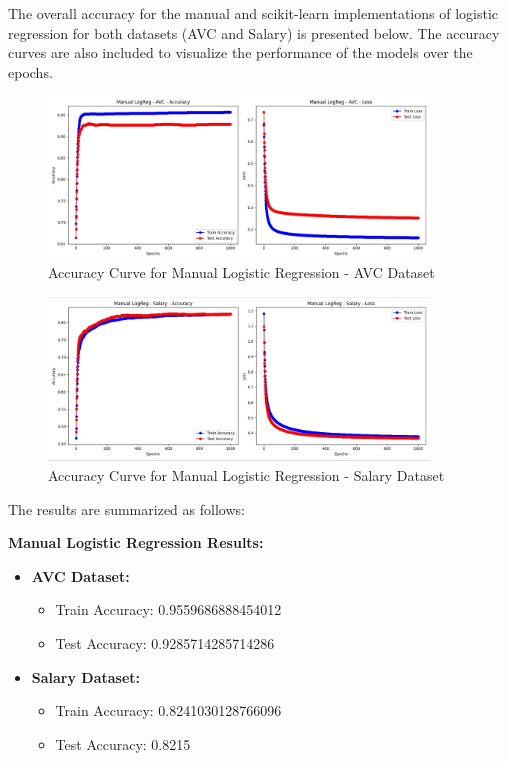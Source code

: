 \documentclass[a4paper,12pt]{article}
\begin{document}
The overall accuracy for the manual and scikit-learn implementations of logistic regression for both datasets (AVC and Salary) is presented below. The accuracy curves are also included to visualize the performance of the models over the epochs.

\begin{figure}[H]
    \centering
    \includegraphics[width=0.9\textwidth]{Resources/logreg_curve_avc.jpeg}
    \caption{Accuracy Curve for Manual Logistic Regression - AVC Dataset}
    \label{fig:logreg_curve_avc}
\end{figure}

\begin{figure}[H]
    \centering
    \includegraphics[width=0.9\textwidth]{Resources/logreg_curve_salary.jpeg}
    \caption{Accuracy Curve for Manual Logistic Regression - Salary Dataset}
    \label{fig:logreg_curve_salary}
\end{figure}

The results are summarized as follows:

\textbf{Manual Logistic Regression Results:}
\begin{itemize}
    \item \textbf{AVC Dataset:}
        \begin{itemize}
            \item Train Accuracy: 0.9559686888454012
            \item Test Accuracy: 0.9285714285714286
        \end{itemize}
    \item \textbf{Salary Dataset:}
        \begin{itemize}
            \item Train Accuracy: 0.8241030128766096
            \item Test Accuracy: 0.8215
        \end{itemize}
\end{itemize}
\end{document}
